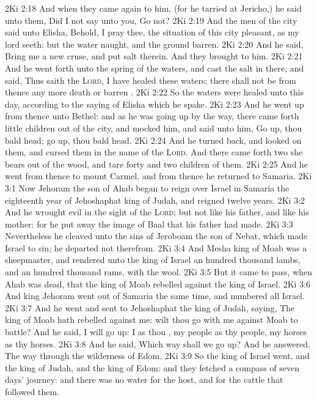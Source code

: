 \vs 2Ki 2:18 And when they came again to him, (for he tarried at Jericho,) he said unto them, Did I not say unto you, Go not?
\vs 2Ki 2:19 And the men of the city said unto Elisha, Behold, I pray thee, the situation of this city  pleasant, as my lord seeth: but the water  naught, and the ground barren.
\vs 2Ki 2:20 And he said, Bring me a new cruse, and put salt therein. And they brought  to him.
\vs 2Ki 2:21 And he went forth unto the spring of the waters, and cast the salt in there, and said, Thus saith the \textsc{Lord}, I have healed these waters; there shall not be from thence any more death or barren .
\vs 2Ki 2:22 So the waters were healed unto this day, according to the saying of Elisha which he spake.
\vs 2Ki 2:23 And he went up from thence unto Bethel: and as he was going up by the way, there came forth little children out of the city, and mocked him, and said unto him, Go up, thou bald head; go up, thou bald head.
\vs 2Ki 2:24 And he turned back, and looked on them, and cursed them in the name of the \textsc{Lord}. And there came forth two she bears out of the wood, and tare forty and two children of them.
\vs 2Ki 2:25 And he went from thence to mount Carmel, and from thence he returned to Samaria.
\vs 2Ki 3:1 Now Jehoram the son of Ahab began to reign over Israel in Samaria the eighteenth year of Jehoshaphat king of Judah, and reigned twelve years.
\vs 2Ki 3:2 And he wrought evil in the sight of the \textsc{Lord}; but not like his father, and like his mother: for he put away the image of Baal that his father had made.
\vs 2Ki 3:3 Nevertheless he cleaved unto the sins of Jeroboam the son of Nebat, which made Israel to sin; he departed not therefrom.
\vs 2Ki 3:4 And Mesha king of Moab was a sheepmaster, and rendered unto the king of Israel an hundred thousand lambs, and an hundred thousand rams, with the wool.
\vs 2Ki 3:5 But it came to pass, when Ahab was dead, that the king of Moab rebelled against the king of Israel.
\vs 2Ki 3:6 And king Jehoram went out of Samaria the same time, and numbered all Israel.
\vs 2Ki 3:7 And he went and sent to Jehoshaphat the king of Judah, saying, The king of Moab hath rebelled against me: wilt thou go with me against Moab to battle? And he said, I will go up: I  as thou , my people as thy people,  my horses as thy horses.
\vs 2Ki 3:8 And he said, Which way shall we go up? And he answered, The way through the wilderness of Edom.
\vs 2Ki 3:9 So the king of Israel went, and the king of Judah, and the king of Edom: and they fetched a compass of seven days' journey: and there was no water for the host, and for the cattle that followed them.

